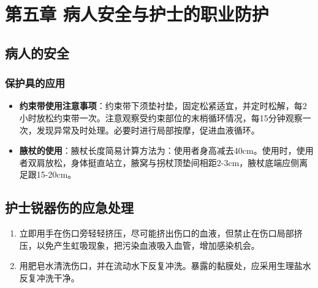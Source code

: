 \documentclass[11pt, a4paper]{ctexart}
\begin{document}
\section{第五章 病人安全与护士的职业防护}
\subsection{病人的安全}
\subsubsection{保护具的应用}
\begin{itemize}
    \item \textbf{约束带使用注意事项}：约束带下须垫衬垫，固定松紧适宜，并定时松解，每2小时放松约束带一次。注意观察受约束部位的末梢循环情况，每15分钟观察一次，发现异常及时处理。必要时进行局部按摩，促进血液循环。
    \item \textbf{腋杖的使用}：腋杖长度简易计算方法为：使用者身高减去40cm。使用时，使用者双肩放松，身体挺直站立，腋窝与拐杖顶垫间相距2-3cm，腋杖底端应侧离足跟15-20cm。
\end{itemize}

\subsection{护士锐器伤的应急处理}
\begin{enumerate}
    \item 立即用手在伤口旁轻轻挤压，尽可能挤出伤口的血液，但禁止在伤口局部挤压，以免产生虹吸现象，把污染血液吸入血管，增加感染机会。
    \item 用肥皂水清洗伤口，并在流动水下反复冲洗。暴露的黏膜处，应采用生理盐水反复冲洗干净。
\end{enumerate}
\end{document}
